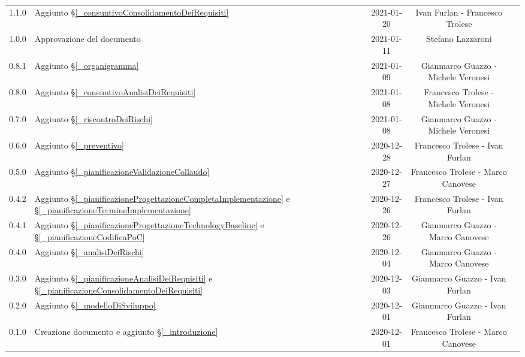 \begin{center}
\begin{longtable}{|c|p{5cm}|c|c|c|}
		1.1.0 & Aggiunto \S\ref{_consuntivoConsolidamentoDeiRequisiti} & 2021-01-20 & Ivan Furlan - Francesco Trolese \\
		1.0.0 & Approvazione del documento & 2021-01-11 & Stefano Lazzaroni \\
		0.8.1 & Aggiunto \S\ref{_organigramma} & 2021-01-09 & Gianmarco Guazzo - Michele Veronesi \\
		0.8.0 & Aggiunto \S\ref{_consuntivoAnalisiDeiRequisiti} & 2021-01-08 & Francesco Trolese - Michele Veronesi \\
		0.7.0 & Aggiunto \S\ref{_riscontroDeiRischi} & 2021-01-08 & Gianmarco Guazzo - Michele Veronesi \\
		0.6.0 & Aggiunto \S\ref{_preventivo} & 2020-12-28 & Francesco Trolese - Ivan Furlan \\
		0.5.0 & Aggiunto \S\ref{_pianificazioneValidazioneCollaudo} & 2020-12-27 & Francesco Trolese - Marco Canovese \\
		0.4.2 & Aggiunto \S\ref{_pianificazioneProgettazioneCompletaImplementazione} e \S\ref{_pianificazioneTermineImplementazione} & 2020-12-26 & Francesco Trolese - Ivan Furlan \\
		0.4.1 & Aggiunto \S\ref{_pianificazioneProgettazioneTechnologyBaseline} e \S\ref{_pianificazioneCodificaPoC} & 2020-12-26 & Gianmarco Guazzo - Marco Canovese \\
		0.4.0 & Aggiunto \S\ref{_analisiDeiRischi} & 2020-12-04 & Gianmarco Guazzo - Marco Canovese \\
		0.3.0 & Aggiunto \S\ref{_pianificazioneAnalisiDeiRequisiti} e \S\ref{_pianificazioneConsolidamentoDeiRequisiti} & 2020-12-03 & Gianmarco Guazzo - Ivan Furlan \\
		0.2.0 & Aggiunto \S\ref{_modelloDiSviluppo} & 2020-12-01 & Gianmarco Guazzo - Ivan Furlan \\
		0.1.0 & Creazione documento e aggiunto \S\ref{_introduzione} & 2020-12-01 & Francesco Trolese - Marco Canovese \\
		\hline
	\end{longtable}
\end{center}